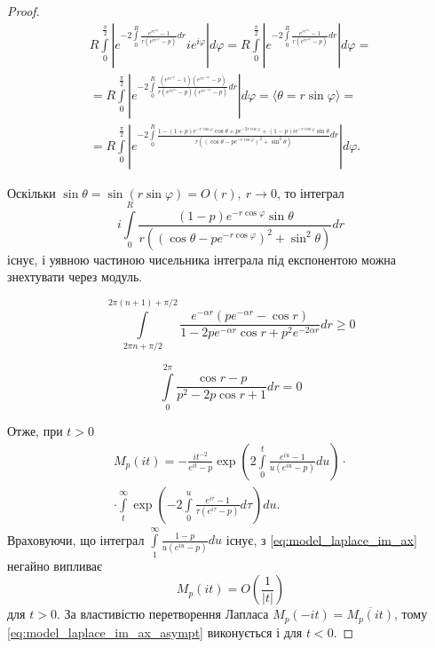 \begin{lem}
\begin{proof}
\begin{equation}
\begin{gathered}
R \int\limits_{0}^{\frac{\pi}{2}} \left| e^{-2 \int\limits_{0}^{R} \frac{e^{re^{i\varphi}} -1}{r(e^{re^{i\varphi}} - p)} dr} i e^{i\varphi} \right| d\varphi = R \int\limits_{0}^{\frac{\pi}{2}} \left| e^{-2 \int\limits_{0}^{R} \frac{e^{re^{i\varphi}} -1}{r(e^{re^{i\varphi}} - p)} dr} \right| d\varphi=\\
=R \int\limits_{0}^{\frac{\pi}{2}} \left| e^{-2 \int\limits_{0}^{R} \frac{(e^{re^{i\varphi}} -1)(e^{re^{-i\varphi}} - p)}{r(e^{re^{i\varphi}} - p)(e^{re^{-i\varphi}} - p)} dr} \right| d\varphi = \langle \theta = r \sin \varphi \rangle = \\
=R \int\limits_{0}^{\frac{\pi}{2}} \left| e^{-2 \int\limits_{0}^{R} \frac{1- (1+p)e^{-r \cos \varphi} \cos \theta + p e^{-2r \cos \varphi} + (1-p)ie^{-r \cos \varphi} \sin \theta}{r((\cos \theta - pe^{-r\cos \varphi})^{2} + \sin^2 \theta)} dr} \right| d\varphi.
\end{gathered}
\end{equation}

Оскільки $\sin \theta = \sin (r \sin \varphi)= O(r), ~ r \rightarrow 0$, то інтеграл
\begin{equation*}
i \int\limits_{0}^{R} \frac{(1-p)e^{-r \cos \varphi} \sin \theta}{r((\cos \theta - pe^{-r\cos \varphi})^{2} + \sin^2 \theta)} dr
\end{equation*}
існує, і уявною частиною чисельника інтеграла під експонентою можна знехтувати через модуль.

\begin{equation}
\int\limits_{2\pi n + \pi / 2}^{2\pi (n + 1) + \pi / 2} \frac{e^{-\alpha r} (p e^{-\alpha r} - \cos r)}{1 - 2pe^{-\alpha r} \cos r + p^2 e^{-2 \alpha r}} dr \geq 0
\end{equation}

\begin{equation}
	\int\limits_{0}^{2 \pi} \frac{\cos r -  p}{p^2 - 2 p \cos r + 1} dr = 0
\end{equation}


Отже, при $t>0$
\begin{equation}
\label{eq:model_laplace_im_ax}
\begin{split}
M_{p}(it) = -\frac{i t^{-2}}{e^{it}-p} \exp \left(2 \int\limits_{0}^{t} \frac{e^{iu} -1}{u(e^{iu} - p)} du\right) \cdot \\
\cdot \int\limits_t^\infty \exp\left(-2 \int\limits_{0}^{u} \frac{e^{i\tau} -1}{\tau(e^{i\tau} - p)} d\tau\right) du.
\end{split}
\end{equation}
Враховуючи, що інтеграл $\int\limits_{1}^{\infty} \frac{1-p}{u(e^{iu} - p)} du$ існує, з \eqref{eq:model_laplace_im_ax} негайно випливає
\begin{equation}
\label{eq:model_laplace_im_ax_asympt}
M_{p}(it) = O\left(\frac{1}{|t|}\right)
\end{equation}
для $t > 0$. За властивістю перетворення Лапласа $M_{p}(-it) = \overline{M_{p}(it)}$, тому \eqref{eq:model_laplace_im_ax_asympt} виконується і для $t < 0$.
\end{proof}
\end{lem}

